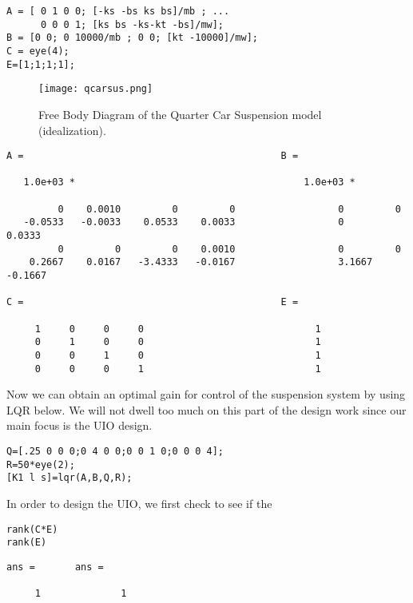 \documentclass{amsart}
\theoremstyle{definition}
\theoremstyle{remark}
\numberwithin{equation}{section}
\begin{document}
\begin{verbatim}
A = [ 0 1 0 0; [-ks -bs ks bs]/mb ; ...
      0 0 0 1; [ks bs -ks-kt -bs]/mw];
B = [0 0; 0 10000/mb ; 0 0; [kt -10000]/mw];
C = eye(4);
E=[1;1;1;1];
\end{verbatim}
 
\begin{figure}[H]
    \centering
    \texttt{[image: qcarsus.png]}
    \caption{Free Body Diagram of the Quarter Car Suspension model (idealization).}
    \label{fig:car_sus_fbd}
\end{figure}

\color{lightgray} \begin{verbatim}
A =                                             B = 

   1.0e+03 *                                        1.0e+03 *

         0    0.0010         0         0                  0         0
   -0.0533   -0.0033    0.0533    0.0033                  0         0.0333
         0         0         0    0.0010                  0         0
    0.2667    0.0167   -3.4333   -0.0167                  3.1667   -0.1667

C =                                             E = 

     1     0     0     0                              1
     0     1     0     0                              1
     0     0     1     0                              1
     0     0     0     1                              1

\end{verbatim} \color{black}
Now we can obtain an optimal gain for control of the suspension system by using LQR below.  We will not dwell too much on this part of the design work since our main focus is the UIO design.  

\begin{verbatim}
Q=[.25 0 0 0;0 4 0 0;0 0 1 0;0 0 0 4];
R=50*eye(2);
[K1 l s]=lqr(A,B,Q,R);
\end{verbatim}

In order to design the UIO, we first check to see if the 
\vspace{1em}
\begin{verbatim}
rank(C*E)
rank(E)
\end{verbatim}

        \color{lightgray} \begin{verbatim}
ans =       ans =

     1              1
\end{verbatim} \color{black}
    
\end{document}

